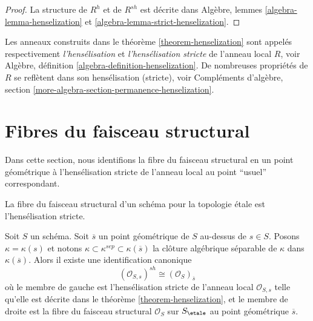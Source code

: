 \begin{proof}
La structure de $R^h$ et de $R^{sh}$ est d\'ecrite dans
Algèbre, lemmes \ref{algebra-lemma-henselization} et
\ref{algebra-lemma-strict-henselization}.
\end{proof}

\noindent
Les anneaux construits dans le th\'eor\`eme \ref{theorem-henselization}
sont appel\'es respectivement {\it l'hens\'elisation} et
{\it l'hens\'elisation stricte} de l'anneau local $R$, voir
Algèbre, définition \ref{algebra-definition-henselization}.
De nombreuses propri\'et\'es de $R$ se refl\`etent dans son hens\'elisation (stricte),
voir Compléments d'algèbre,
section \ref{more-algebra-section-permanence-henselization}.




\section{Fibres du faisceau structural}
\label{section-stalks-structure-sheaf}

\noindent
Dans cette section, nous identifions la fibre du faisceau structural en un point
g\'eom\'etrique \`a l'hens\'elisation stricte de l'anneau local au point
``usuel'' correspondant.

\begin{lemma}
\label{lemma-describe-etale-local-ring}
\begin{slogan}
La fibre du faisceau structural d'un sch\'ema
pour la topologie \'etale est l'hens\'elisation stricte.
\end{slogan}
Soit $S$ un sch\'ema.
Soit $\overline{s}$ un point g\'eom\'etrique de $S$ au-dessus de $s \in S$.
Posons $\kappa = \kappa(s)$ et notons
$\kappa \subset \kappa^{sep} \subset \kappa(\overline{s})$
la cl\^oture alg\'ebrique s\'eparable de $\kappa$ dans $\kappa(\overline{s})$.
Alors il existe une identification canonique
$$
(\mathcal{O}_{S, s})^{sh}
\cong
(\mathcal{O}_S)_{\overline{s}}
$$
o\`u le membre de gauche est l'hens\'elisation stricte de l'anneau local
$\mathcal{O}_{S, s}$ telle qu'elle est d\'ecrite dans le
th\'eor\`eme \ref{theorem-henselization},
et le membre de droite est la fibre du faisceau structural
$\mathcal{O}_S$ sur $S_\etale$ au
point g\'eom\'etrique $\overline{s}$.
\end{lemma}

